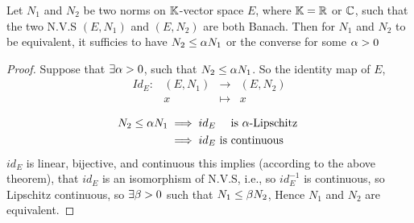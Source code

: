\begin{theorem}[]
Let $N_1 $ and $N_2 $ be two
norms on $\mathbb{K} $-vector space $E $, where $\mathbb{K} = \mathbb{R}  $  or $\mathbb{C}  $,
such that the two N.V.S $(E,N_1)  $ and $(E,N_2)  $ are both 
Banach. Then for $N_1 $ and $N_2 $ to be equivalent, it 
sufficies to have $N_2 \leq \alpha N_1 $  or the converse 
for some $\alpha > 0 $
\end{theorem}
\begin{proof}
Suppose that $\exists  \alpha > 0 $, such that 
$N_2 \leq \alpha N_1 $. So the identity map 
of $E $, \[
\begin{array}{cccc}
      Id_{E} : &  (E,N_1)   & \longrightarrow & 
      (E,N_2) \\

           &  x  & \longmapsto     & x \\ 
\end{array}
\]
\begin{align*}
N_2 \leq \alpha N_1 & \implies 
id_{E} \quad  \text{ is $\alpha $-Lipschitz }  \\
		  & \implies 
		  id_{E} \text{ is continuous }
\end{align*}
$id_{E} $ is linear, bijective, and continuous this implies 
(according to the above theorem), that $id_{E} $ is 
an isomorphism of N.V.S, i.e., so $id_{E}^{-1} $  is 
continuous, so Lipschitz continuous, so $\exists \beta > 0 $  such
that $N_1 \leq \beta N_2 $, Hence $N_1 $  and $N_2 $ 
are equivalent.
\end{proof}
% 
